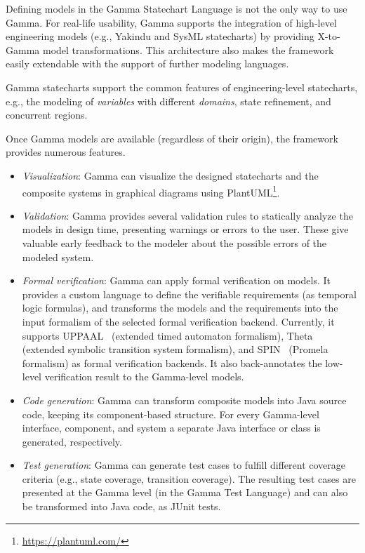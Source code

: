 Defining models in the Gamma Statechart Language is not the only way to use Gamma. For real-life usability, Gamma supports the integration of high-level engineering models (e.g., Yakindu and SysML statecharts) by providing X-to-Gamma model transformations. This architecture also makes the framework easily extendable with the support of further modeling languages.

Gamma statecharts support the common features of engineering-level statecharts, e.g., the modeling of \textit{variables} with different \textit{domains}, state refinement, and concurrent regions.

Once Gamma models are available (regardless of their origin), the framework provides numerous features.

\begin{itemize}
    \item \textit{Visualization}: Gamma can visualize the designed statecharts and the composite systems in graphical diagrams using PlantUML\footnote{\url{https://plantuml.com/}}.
    \item \textit{Validation}: Gamma provides several validation rules to statically analyze the models in design time, presenting warnings or errors to the user. These give valuable early feedback to the modeler about the possible errors of the modeled system.
    \item \textit{Formal verification}: Gamma can apply formal verification on models. It provides a custom language to define the verifiable requirements (as temporal logic formulas), and transforms the models and the requirements into the input formalism of the selected formal verification backend. Currently, it supports UPPAAL~\cite{uppaal} (extended timed automaton formalism), Theta~\cite{Theta} (extended symbolic transition system formalism), and SPIN~\cite{spin} (Promela formalism) as formal verification backends. It also back-annotates the low-level verification result to the Gamma-level models.
    \item \textit{Code generation}: Gamma can transform composite models into Java source code, keeping its component-based structure. For every Gamma-level interface, component, and system a separate Java interface or class is generated, respectively.
    \item \textit{Test generation}: Gamma can generate test cases to fulfill different coverage criteria (e.g., state coverage, transition coverage). The resulting test cases are presented at the Gamma level (in the Gamma Test Language) and can also be transformed into Java code, as JUnit tests.
\end{itemize}

